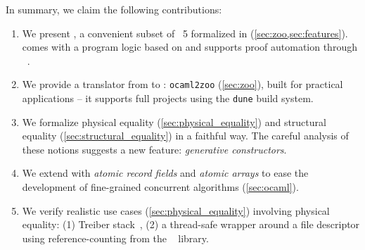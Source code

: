 In summary, we claim the following contributions:
\begin{enumerate}
  \item
    We present \ZooLang, a convenient subset of \OCaml~5 formalized in \Rocq (\cref{sec:zoo,sec:features}).
    \ZooLang comes with a program logic based on \Iris and supports proof automation through \Diaframe~\cite{DBLP:conf/pldi/MulderKG22,DBLP:journals/pacmpl/MulderK23}.
  \item
    We provide a translator from \OCaml to \ZooLang: \texttt{ocaml2zoo} (\cref{sec:zoo}), built for practical
    applications -- it supports full projects using the \texttt{dune} build system.
  \item
    We formalize physical equality (\cref{sec:physical_equality}) and structural equality (\cref{sec:structural_equality}) in a faithful way.
    The careful analysis of these notions suggests a new \OCaml feature: \emph{generative constructors}.
  \item
    We extend \OCaml with \emph{atomic record fields} and \emph{atomic arrays} to ease the development of fine-grained concurrent algorithms (\cref{sec:ocaml}).
  \item
    We verify realistic use cases (\cref{sec:physical_equality}) involving physical equality: (1) Treiber stack~\cite{thomas1986systems}, (2) a thread-safe wrapper around a file descriptor using reference-counting from the \Eio~\cite{eio} library.
\end{enumerate}
